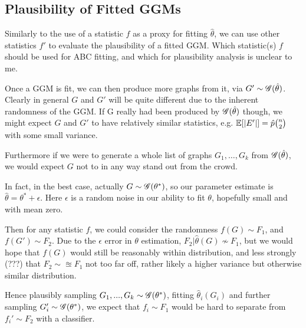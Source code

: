\subsection{Plausibility of Fitted GGMs}

Similarly to the use of a statistic $f$ as a proxy for fitting $\hat{\theta}$, we can use other statistics $f'$ to evaluate the plausibility of a fitted GGM. Which statistic(s) $f$ should be used for ABC fitting, and which for plausibility analysis is unclear to me.

Once a GGM is fit, we can then produce more graphs from it, via $G' \sim \mathscr{G}(\hat{\theta})$. Clearly in general $G$ and $G'$ will be quite different due to the inherent randomness of the GGM. If G really had been produced by $\mathscr{G}(\hat{\theta})$ though, we might expect $G$ and $G'$ to have relatively similar statistics, e.g. $\mathbb{E}[|E'|] = \hat{p} \binom{n}{2}$ with some small variance.

Furthermore if we were to generate a whole list of graphs $G_1, \dots, G_k$ from $\mathscr{G}(\hat{\theta})$, we would expect $G$ not to in any way stand out from the crowd.

In fact, in the best case, actually $G \sim \mathscr{G}(\theta^*)$, so our parameter estimate is $\hat{\theta} = \theta^* + \epsilon$. Here $\epsilon$ is a random noise in our ability to fit $\theta$, hopefully small and with mean zero. 

Then for any statistic $f$, we could consider the randomness $f(G) \sim F_1$, and $f(G') \sim F_2$. Due to the $\epsilon$ error in $\theta$ estimation, $F_2| \hat{\theta}(G) \nsim F_1$, but we would hope that $f(G)$ would still be reasonably within distribution, and less strongly (???) that $F_2 \sim \approxeq F_1$ not too far off, rather likely a higher variance but otherwise similar distribution.


Hence plausibly sampling $G_1, ..., G_k \sim \mathscr{G}(\theta^*)$, fitting $\hat{\theta}_i(G_i)$ and further sampling $G_i' \sim \mathscr{G}(\theta^*)$, we expect that $f_i \sim F_1$ would be hard to separate from $f_i' \sim F_2$ with a classifier.




